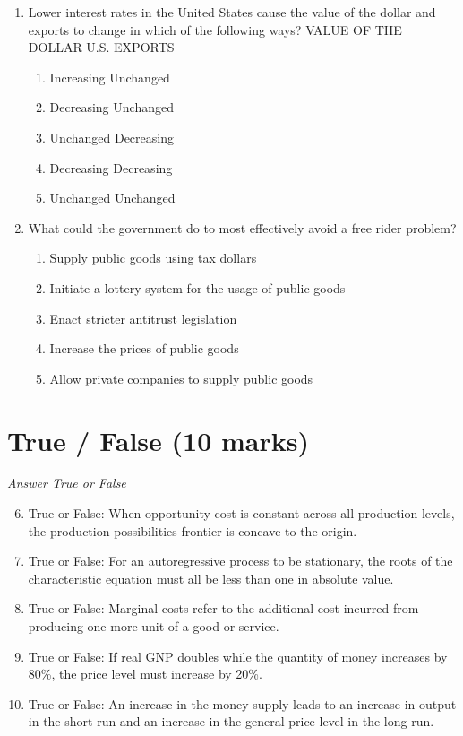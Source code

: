 \documentclass[12pt]{article}
\begin{document}
\begin{enumerate}[label=\arabic*.]
\item Lower interest rates in the United States cause the value of the dollar and exports to change in which of the following ways? VALUE OF THE DOLLAR U.S. EXPORTS
\begin{enumerate}[label=(\alph*)]
    \item Increasing Unchanged
    \item Decreasing Unchanged
    \item Unchanged Decreasing
    \item Decreasing Decreasing
    \item Unchanged Unchanged
\end{enumerate}
\item What could the government do to most effectively avoid a free rider problem?
\begin{enumerate}[label=(\alph*)]
    \item Supply public goods using tax dollars
    \item Initiate a lottery system for the usage of public goods
    \item Enact stricter antitrust legislation
    \item Increase the prices of public goods
    \item Allow private companies to supply public goods
\end{enumerate}
\end{enumerate}

\section*{True / False (10 marks)}
\textit{Answer True or False}
\begin{enumerate}[label=\arabic*.]
\setcounter{enumi}{5}
\item True or False: When opportunity cost is constant across all production levels, the production possibilities frontier is concave to the origin.
\item True or False: For an autoregressive process to be stationary, the roots of the characteristic equation must all be less than one in absolute value.
\item True or False: Marginal costs refer to the additional cost incurred from producing one more unit of a good or service.
\item True or False: If real GNP doubles while the quantity of money increases by 80\%, the price level must increase by 20\%.
\item True or False: An increase in the money supply leads to an increase in output in the short run and an increase in the general price level in the long run.
\end{enumerate}
\end{document}
